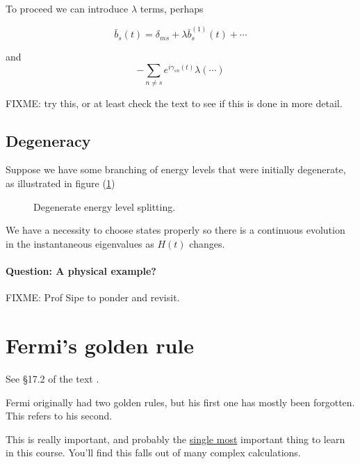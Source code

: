 To proceed we can introduce $\lambda$ terms, perhaps

\begin{equation}\label{eqn:qmTwoL9:290}
\bar{b}_s(t) = \delta_{ms} + \lambda \bar{b}^{(1)}_s(t) + \cdots
\end{equation}

and 
\begin{equation}\label{eqn:qmTwoL9:310}
- \sum_{n \ne s} e^{i \gamma_{sn}(t)} \lambda (\cdots)
\end{equation}

FIXME: try this, or at least check the text to see if this is done in more detail.

\subsection{Degeneracy}

Suppose we have some branching of energy levels that were initially degenerate, as illustrated in figure (\ref{fig:qmTwoL9:3})

\begin{figure}[htp]
   \centering
   \def\svgwidth{0.3\columnwidth}
   
   \caption{Degenerate energy level splitting.}\label{fig:qmTwoL9:3}
\end{figure}

We have a necessity to choose states properly so there is a continuous evolution in the instantaneous eigenvalues as $H(t)$ changes.

\paragraph{Question: A physical  example?}

FIXME: Prof Sipe to ponder and revisit.

\section{Fermi's golden rule}

See \S 17.2 of the text \cite{desai2009quantum}.

Fermi originally had two golden rules, but his first one has mostly been forgotten.  This refers to his second.

This is really important, and probably the \underline{single most} important thing to learn in this course.  You'll find this falls out of many complex calculations.

